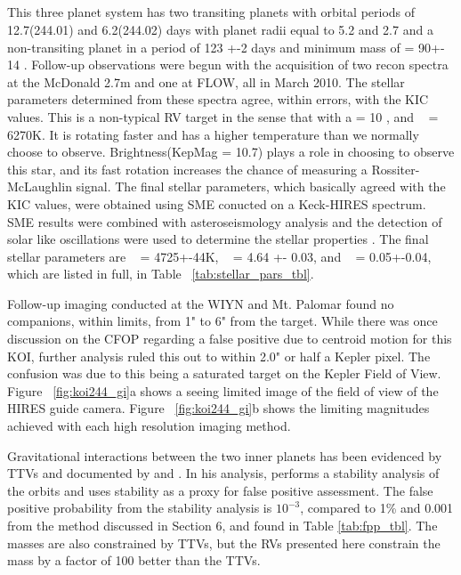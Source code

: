 \documentclass{emulateapj}
\begin{document}
\subsection{\koitwofourfour} %
This three planet system has two transiting planets with orbital periods of 12.7(244.01) and 6.2(244.02) days with planet radii equal to 5.2 and 2.7 \rearth and a non-transiting planet in a period of 123 +-2 days and minimum mass of \msini =  90+- 14 \mearthe.  Follow-up observations were begun with the acquisition of two recon spectra at the McDonald 2.7m and one at FLOW, all in March 2010. The stellar parameters determined from these spectra agree, within errors, with the KIC values. This is a non-typical RV target in the sense that with a \vsini = 10 \kms, and \teff~ = 6270K. It is rotating faster and has a higher temperature than we normally choose to observe. Brightness(KepMag = 10.7)  plays a role in choosing to observe this star, and its fast rotation increases the chance of measuring a Rossiter-McLaughlin signal. The final stellar parameters, which basically agreed with the KIC values, were obtained using SME conucted on a Keck-HIRES spectrum. SME results were combined with asteroseismology analysis and the detection of solar like oscillations were used to determine the stellar properties \citep{Huber2013}. The final stellar parameters are \teff~ = 4725+-44K, \logg~ = 4.64 +- 0.03, and \feh~ = 0.05+-0.04, which are listed in full,  in Table ~\ref{tab:stellar_pars_tbl}.

Follow-up imaging conducted at the WIYN and Mt. Palomar found no companions, within limits, from 1" to 6" from the target.  While there was once discussion on the CFOP regarding a false positive due to centroid motion for this KOI, further analysis ruled this out to within 2.0" or half a Kepler pixel. The confusion was due to this being a saturated target  on the Kepler Field of View. Figure ~\ref{fig:koi244_gi}a shows a seeing limited  image of the field of view of the HIRES guide camera.  Figure  ~\ref{fig:koi244_gi}b shows the limiting magnitudes achieved with each high resolution imaging method.  


Gravitational interactions between the two inner planets has been evidenced by TTVs and documented by \cite{Steffen2012_keplerIII} and \cite{Wu2012}.  In his analysis, \cite{Steffen2012_keplerIII} performs a stability analysis of the orbits and uses stability as a proxy for false positive assessment. The false positive probability from the stability analysis is  $10^{-3}$, compared to 1\% and 0.001 from the \cite{Morton2012} method discussed in Section 6, and found in Table \ref{tab:fpp_tbl}. The masses are also constrained by TTVs, but the RVs presented here constrain the mass by a factor of 100 better than the TTVs. 
\end{document}
